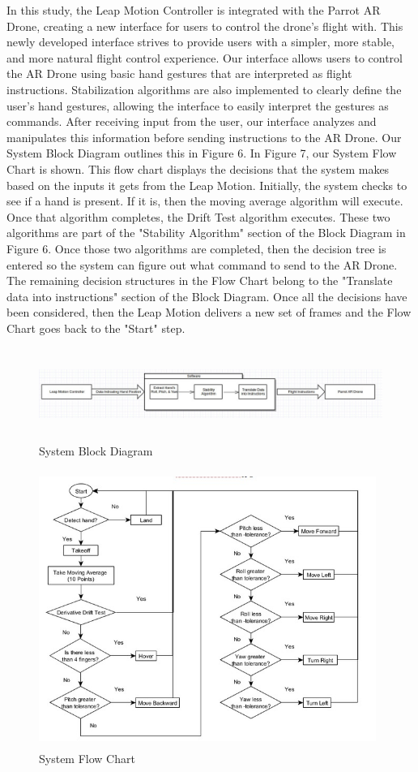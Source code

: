 \documentclass[letterpaper,english, 12pt]{article}
\begin{document}
 
In this study, the Leap Motion Controller is integrated with the Parrot AR Drone, creating a new interface for users to control the drone's flight with. This newly developed interface strives to provide users with a simpler, more stable, and more natural flight control experience. Our interface allows users to control the AR Drone using basic hand gestures that are interpreted as flight instructions. Stabilization algorithms are also implemented to clearly define the user's hand gestures, allowing the interface to easily interpret the gestures as commands. After receiving input from the user, our interface analyzes and manipulates this information before sending instructions to the AR Drone. Our System Block Diagram outlines this in Figure 6. In Figure 7, our System Flow Chart is shown. This flow chart displays the decisions that the system makes based on the inputs it gets from the Leap Motion. Initially, the system checks to see if a hand is present. If it is, then the moving average algorithm will execute. Once that algorithm completes, the Drift Test algorithm executes. These two algorithms are part of the "Stability Algorithm" section of the Block Diagram in Figure 6. Once those two algorithms are completed, then the decision tree is entered so the system can figure out what command to send to the AR Drone.  The remaining decision structures in the Flow Chart belong to the "Translate data into instructions" section of the Block Diagram. Once all the decisions have been considered, then the Leap Motion delivers a new set of frames and the Flow Chart goes back to the "Start" step.


\begin{figure}[H]
	\centering
	\includegraphics[height=3cm,width=150mm]{pics/blockDiagram1.jpg}
	\caption{System Block Diagram}
\end{figure}


\begin{figure}[H]
	\centering
	\includegraphics[height=9cm,width=110mm]{pics/controlFlowChart.jpg}
	\caption{System Flow Chart}
\end{figure}
\end{document}
